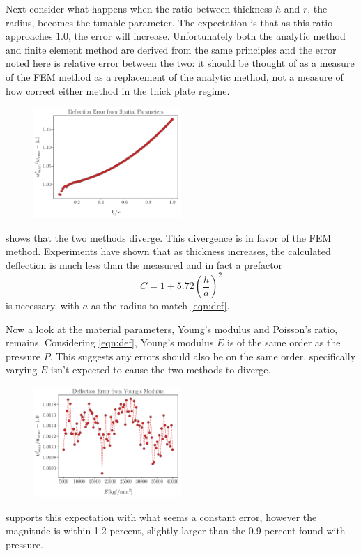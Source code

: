 \documentclass[12pt,times,twocolumn,3p]{elsarticle}
\begin{document}
Next consider what happens when the ratio between thickness $h$ and $r$, the
radius, becomes the tunable parameter. The expectation is that as this ratio
approaches $1.0$, the error will increase. Unfortunately both the analytic
method and finite element method are derived from the same principles and the
error noted here is relative error between the two: it should be thought of as
a measure of the FEM method as a replacement of the analytic method, not a
measure of how correct either method in the thick plate regime.
\begin{figure}[h]
    \centering
    \includegraphics[width=0.5\textwidth]{./tr_scaling_err.pdf}
    \caption{}
    \label{fig:tre}
\end{figure}
shows that the two methods diverge. This divergence is in favor of the FEM method.
Experiments have shown that as thickness increases, the calculated deflection is
much less than the measured and in fact a prefactor
\begin{equation} \label{eqn:pre}
    C = 1 + 5.72\left(\frac{h}{a}\right)^2
\end{equation}
is necessary, with $a$ as the radius to match \cref{eqn:def}.

Now a look at the material parameters, Young's modulus and Poisson's ratio, remains.
Considering \cref{eqn:def}, Young's modulus $E$ is of the same order as the pressure $P$.
This suggests any errors should also be on the same order, specifically varying $E$
isn't expected to cause the two methods to diverge. 
\begin{figure}[h]
    \centering
    \includegraphics[width=0.5\textwidth]{./ym_scaling_err.pdf}
    \caption{}
    \label{fig:vre}
\end{figure}
supports this expectation with what seems a constant error, however the magnitude
is within 1.2 percent, slightly larger than the 0.9 percent found with pressure.
\end{document}
